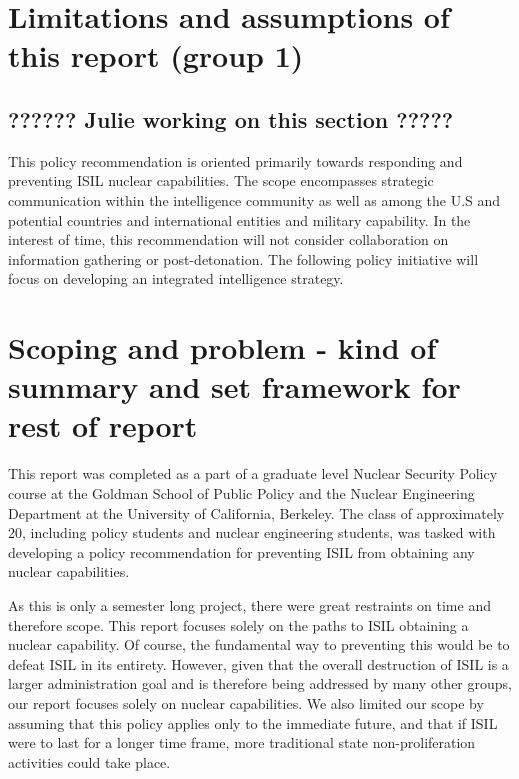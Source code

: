 \documentclass{report}
\begin{document}
\section{Limitations and assumptions of this report (group 1)}

\subsection{?????? Julie working on this section ?????}



This policy recommendation is oriented primarily towards responding and preventing ISIL nuclear capabilities. The scope encompasses strategic communication within the intelligence community as well as among the U.S and potential countries and international entities and military capability. In the interest of time, this recommendation will not consider collaboration on information gathering or post-detonation. The following policy initiative will focus on developing an integrated intelligence strategy. 

\section{Scoping and problem - kind of summary and set framework for rest of report}

This report was completed as a part of a graduate level Nuclear Security Policy course at the Goldman School of Public Policy and the Nuclear Engineering Department at the University of California, Berkeley. The class of approximately 20, including policy students and nuclear engineering students, was tasked with developing a policy recommendation for preventing ISIL from obtaining any nuclear capabilities.

As this is only a semester long project, there were great restraints on time and therefore scope. This report focuses solely on the paths to ISIL obtaining a nuclear capability. Of course, the fundamental way to preventing this would be to defeat ISIL in its entirety. However, given that the overall destruction of ISIL is a larger administration goal and is therefore being addressed by many other groups, our report focuses solely on nuclear capabilities. We also limited our scope by assuming that this policy applies only to the immediate future, and that if ISIL were to last for a longer time frame, more traditional state non-proliferation activities could take place.
\end{document}

